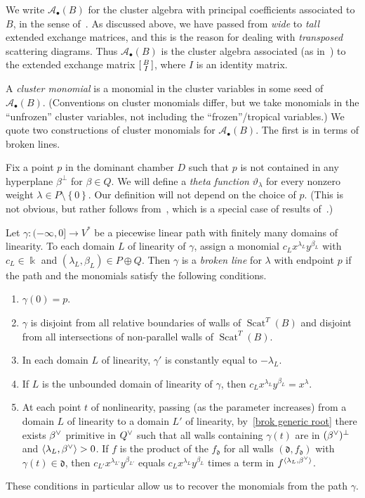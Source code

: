 \documentclass[10pt,a4paper]{amsart}
\theoremstyle{definition}
\DeclareMathOperator{\Scat}{Scat}
\newcommand{\newword}[1]{\emph{#1}}
\newcommand{\thet}{\vartheta}
\newcommand{\set}[1]{{\left\lbrace #1 \right\rbrace}}
\newcommand{\br}[1]{{\langle #1 \rangle}}
\newcommand{\A}{{\mathcal A}}
\newcommand{\ck}{\spcheck}
\renewcommand{\k}{\Bbbk}
\renewcommand{\d}{{\mathfrak d}}
\begin{document}
We write $\A_\bullet(B)$ for the cluster algebra with principal coefficients associated to $B$, in the sense of~\cite[Definition~3.1]{ca4}.
As discussed above, we have passed from \emph{wide} to \emph{tall} extended exchange matrices, and this is the reason for dealing with \emph{transposed} scattering diagrams.
Thus $\A_\bullet(B)$ is the cluster algebra associated (as in~\cite[Definition~2.12]{ca4}) to the extended exchange matrix $\begin{bsmallmatrix}B\\I\end{bsmallmatrix}$, where $I$ is an identity matrix.

A \newword{cluster monomial} is a monomial in the cluster variables in some seed of $\A_\bullet(B)$.
(Conventions on cluster monomials differ, but we take monomials in the ``unfrozen'' cluster variables, not including the ``frozen''/tropical variables.)
We quote two constructions of cluster monomials for $\A_\bullet(B)$.
The first is in terms of broken lines.

Fix a point $p$ in the dominant chamber $D$ such that $p$ is not contained in any hyperplane $\beta^\perp$ for $\beta\in Q$.
We will define a \newword{theta function} $\thet_\lambda$ for every nonzero weight $\lambda\in P\setminus\set{0}$.
Our definition will not depend on the choice of $p$.
(This is not obvious, but rather follows from~\cite[Theorem~3.5]{GHKK}, which is a special case of results of~\cite[Section~4]{CPS}.)

Let $\gamma:(-\infty,0]\to V^*$ be a piecewise linear path with finitely many domains of linearity.
To each domain $L$ of linearity of $\gamma$, assign a monomial $c_Lx^{\lambda_L}y^{\beta_L}$ with $c_L\in\k$ and $(\lambda_L,\beta_L)\in P\oplus Q$.
Then $\gamma$ is a \newword{broken line} for $\lambda$ with endpoint $p$ if the path and the monomials satisfy the following conditions. 
\begin{enumerate}[label=(\roman*)]%
\item $\gamma(0)=p$.
\item \label{brok generic root}
$\gamma$ is disjoint from all relative boundaries of walls of $\Scat^T(B)$ and disjoint from all intersections of non-parallel walls of $\Scat^T(B)$. 
\item In each domain $L$ of linearity, $\gamma'$ is constantly equal to $-\lambda_L$.
\item If $L$ is the unbounded domain of linearity of $\gamma$, then $c_Lx^{\lambda_L}y^{\beta_L}=x^\lambda$.
\item \label{change slope}
At each point $t$ of nonlinearity, passing (as the parameter increases) from a domain $L$ of linearity to a domain $L'$ of linearity, by~\ref{brok generic root} there exists $\beta\ck$ primitive in $Q\ck$ such that all walls containing $\gamma(t)$ are in $(\beta\ck)^\perp$ and ${\br{\lambda_L,\beta\ck}>0}$.
If $f$ is the product of the $f_\d$ for all walls $(\d,f_\d)$ with $\gamma(t)\in\d$, then $c_{L'}x^{\lambda_{L'}}y^{\beta_{L'}}$ equals $c_Lx^{\lambda_L}y^{\beta_L}$ times a term in $f^{\br{\lambda_L,\beta\ck}}$.
\end{enumerate}
These conditions in particular allow us to recover the monomials from the path $\gamma$.
\end{document}
